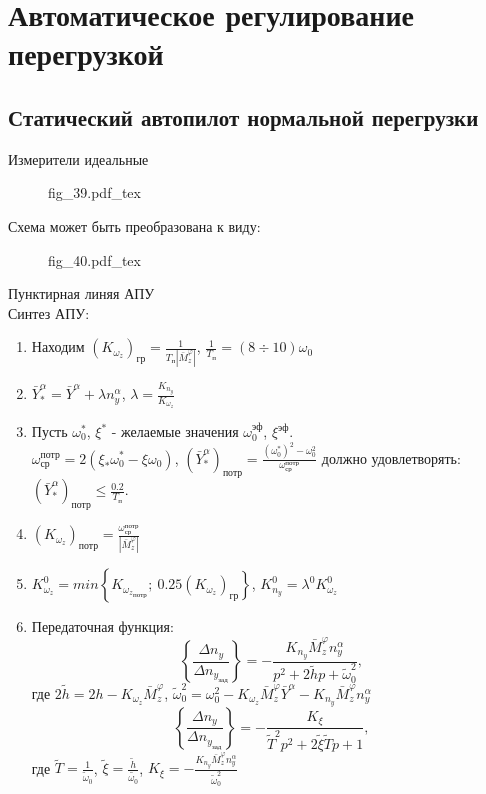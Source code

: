 \documentclass{article}
\begin{document}
\section{Автоматическое регулирование перегрузкой}
\subsection{Статический автопилот нормальной перегрузки}
Измерители идеальные
\begin{figure}[H]
    \centering
    {fig_39.pdf_tex}
\end{figure}

Схема может быть преобразована к виду:

\begin{figure}[H]
    \centering
    {fig_40.pdf_tex}
\end{figure}

Пунктирная линяя АПУ\\
Синтез АПУ:
\begin{enumerate}
    \item Находим $(K_{\omega_z})_\text{гр} =\frac{1}{T_\text{п}
        |\bar{M}_z^{\varphi}|}$, $\frac{1}{T_\text{п}} = (8 \div 10)\omega_0$
    \item $\bar{Y}_*^\alpha =\bar{Y}^\alpha + \lambda n_y^\alpha$, $\lambda =
        \frac{K_{n_y}}{K_{\omega_z}}$
    \item Пусть $\omega_0^*$, $\xi^*$ - желаемые значения
        $\omega_0^{\text{эф}}$, $\xi^{\text{эф}}$.\\
          $\omega_\text{ср}^\text{потр} = 2 (\xi_* \omega_0^* - \xi \omega_0)$,
          $(\bar{Y}_*^\alpha)_\text{потр} = \frac{(\omega_0^*)^2 -
          \omega_0^2}{\omega_\text{ср}^\text{потр}}$
          должно удовлетворять: $(\bar{Y}_*^\alpha)_\text{потр} \leq
          \frac{0.2}{T_\text{п}}$.
    \item $(K_{\omega_z})_\text{потр} =
        \frac{\omega_\text{ср}^\text{потр}}{|\bar{M}_z^\varphi|}$
    \item $K_{\omega_z}^0 = min \left\{ K_{{\omega_z}_\text{потр}};\
        0.25(K_{\omega_z})_\text{гр} \right\}$, $K_{n_y}^0 = \lambda^0
        K_{\omega_z}^0$
    \item Передаточная функция:
          \[
              \left\{\frac{\Delta n_y}{\Delta n_{y_\text{зад}}} \right\}  =
              -\frac{K_{n_y}\bar{M}_z^\varphi n_y^\alpha }{p^2 + 2 \tilde{h} p
              + \tilde{\omega}_0^2},
          \]
          где $2 \tilde{h} = 2h - K_{\omega_z} \bar{M}_z^\varphi$,
          $\tilde{\omega}^{2}_0= \omega_0^2 - K_{\omega_z} \bar{M}_z^\varphi
          \bar{Y}^\alpha - K_{n_y} \bar{M}_z^\varphi n_y^\alpha$
          \[
              \left\{\frac{\Delta n_y}{\Delta n_{y_\text{зад}}} \right\} =
              -\frac{K_{\xi}}{\tilde{T}^2 p^2 + 2 \tilde{\xi} \tilde{T}p + 1},
          \]
          где $\tilde{T} = \frac{1}{\tilde{\omega}_0}$, $\tilde{\xi}
          =\frac{\tilde{h}}{\tilde{\omega_{0}}}$, $K_\xi = -\frac{K_{n_y}
          \bar{M}_z^\varphi n_y^\alpha}{\tilde{\omega}_0^2}$
\end{enumerate}
\end{document}
